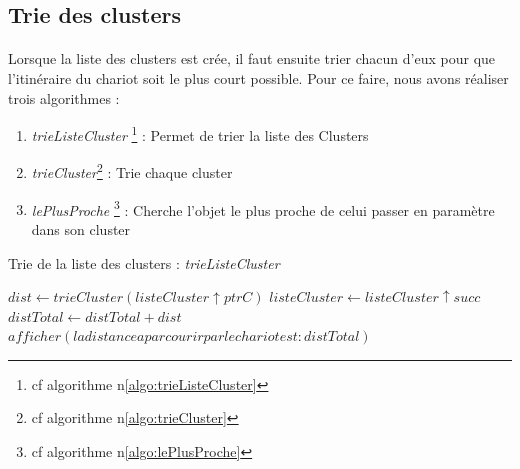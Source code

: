 \documentclass[twoside,UTF8]{EPURapport}
\begin{document}
\subsection{Trie des clusters}

\paragraph{}
Lorsque la liste des clusters est crée, il faut ensuite trier chacun d'eux pour que l'itinéraire du chariot soit le plus court possible. Pour ce faire, nous avons réaliser trois algorithmes :
\begin{enumerate}
\item\textit{trieListeCluster} \footnote{cf algorithme n\degre \ref{algo:trieListeCluster}} : Permet de trier la liste des Clusters
\item\textit{trieCluster}\footnote{cf algorithme n\degre \ref{algo:trieCluster}} : Trie chaque cluster
\item\textit{lePlusProche} \footnote{cf algorithme n\degre \ref{algo:lePlusProche}} : Cherche l'objet le plus proche de celui passer en paramètre dans son cluster
\end{enumerate}

\begin{algorithm}[H]
\caption{Trie de la liste des clusters : \textit{trieListeCluster}}
\label{algo:trieListeCluster}
\begin{algorithmic}[1]

	\STATE $dist \leftarrow trieCluster(listeCluster\uparrow ptrC)$
	\STATE $listeCluster \leftarrow listeCluster\uparrow succ$
	\STATE $distTotal \leftarrow distTotal + dist$
\ENDWHILE
\STATE $afficher(la distance a parcourir par le chariot est : distTotal)$

\end{algorithmic}
\end{algorithm}
\end{document}
